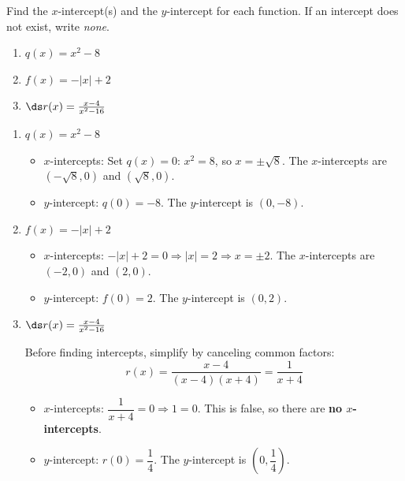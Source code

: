 \documentclass{ximera}
\begin{document}
\begin{problem}
Find the $x$-intercept(s) and the $y$-intercept for each function. If an intercept does not exist, write \textit{none}.
\begin{enumerate}
  \item[(a)] $q(x) = x^2 - 8$
  \medskip
  \item[(b)] $f(x) = -|x| + 2$
  \medskip
  \item[(c)] $\ds r(x) = \frac{x-4}{x^2-16}$
\end{enumerate}

\begin{solution}
\begin{enumerate}
  \item[(a)] $q(x) = x^2-8$
  \begin{itemize}
    \item $x$-intercepts: Set $q(x)=0$: $x^2=8$, so $x = \pm\sqrt{8}$. The $x$-intercepts are $(-\sqrt{8},0)$ and $(\sqrt{8},0)$.
    \item $y$-intercept: $q(0) = -8$. The $y$-intercept is $(0,-8)$.
  \end{itemize}

  \item[(b)] $f(x) = -|x|+2$
  \begin{itemize}
    \item $x$-intercepts: $-|x|+2=0 \Rightarrow |x|=2 \Rightarrow x=\pm2$. The $x$-intercepts are $(-2,0)$ and $(2,0)$.
    \item $y$-intercept: $f(0) = 2$. The $y$-intercept is $(0,2)$.
  \end{itemize}

  \item[(c)] $\ds r(x) = \frac{x-4}{x^2-16}$

  Before finding intercepts, simplify by canceling common factors:
  $$r(x) = \frac{x-4}{(x-4)(x+4)} = \frac{1}{x+4}$$
  \begin{itemize}
    \item $x$-intercepts: $\dfrac{1}{x+4}=0 \Rightarrow 1=0$. This is false, so there are \textbf{no $x$-intercepts}.
    \item $y$-intercept: $r(0) = \dfrac{1}{4}$. The $y$-intercept is $\left(0,\dfrac{1}{4}\right)$.
  \end{itemize}
\end{enumerate}
\end{solution}
\end{problem}
\end{document}

